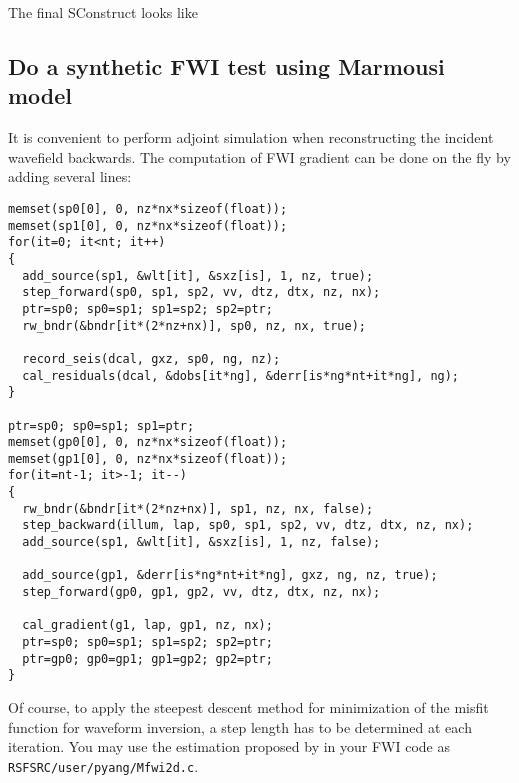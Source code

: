 

The final SConstruct looks like
\lstset{language=python,numbers=left,numberstyle=\tiny,showstringspaces=false}


\subsection{Do a synthetic FWI test using Marmousi model}

It is convenient to perform adjoint simulation when reconstructing the incident wavefield backwards. The computation of FWI gradient can be done on the fly by adding several lines:
\lstset{language=c,numbers=left,numberstyle=\tiny,showstringspaces=false}
\begin{lstlisting}
memset(sp0[0], 0, nz*nx*sizeof(float));
memset(sp1[0], 0, nz*nx*sizeof(float));
for(it=0; it<nt; it++)
{
  add_source(sp1, &wlt[it], &sxz[is], 1, nz, true);
  step_forward(sp0, sp1, sp2, vv, dtz, dtx, nz, nx);
  ptr=sp0; sp0=sp1; sp1=sp2; sp2=ptr;
  rw_bndr(&bndr[it*(2*nz+nx)], sp0, nz, nx, true);

  record_seis(dcal, gxz, sp0, ng, nz);
  cal_residuals(dcal, &dobs[it*ng], &derr[is*ng*nt+it*ng], ng);
}

ptr=sp0; sp0=sp1; sp1=ptr;
memset(gp0[0], 0, nz*nx*sizeof(float));
memset(gp1[0], 0, nz*nx*sizeof(float));
for(it=nt-1; it>-1; it--)
{
  rw_bndr(&bndr[it*(2*nz+nx)], sp1, nz, nx, false);
  step_backward(illum, lap, sp0, sp1, sp2, vv, dtz, dtx, nz, nx);
  add_source(sp1, &wlt[it], &sxz[is], 1, nz, false);

  add_source(gp1, &derr[is*ng*nt+it*ng], gxz, ng, nz, true);
  step_forward(gp0, gp1, gp2, vv, dtz, dtx, nz, nx);

  cal_gradient(g1, lap, gp1, nz, nx);
  ptr=sp0; sp0=sp1; sp1=sp2; sp2=ptr;
  ptr=gp0; gp0=gp1; gp1=gp2; gp2=ptr;
}
\end{lstlisting}
Of course, to apply the steepest descent method for minimization of the misfit function for waveform inversion, a step length has to be determined at each iteration. You may use the estimation proposed by \citet[in the appendix]{Pica_1990_NIS} in your FWI code as \texttt{RSFSRC/user/pyang/Mfwi2d.c}. 


